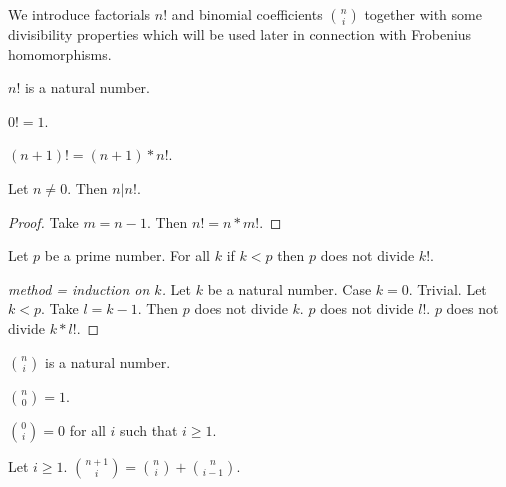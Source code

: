 \documentclass[11pt]{article}
\begin{document}
\newcommand{\cho}[2]{{#1 \choose #2}}

We introduce factorials $n!$ and binomial coefficients
$\cho{n}{i}$ together with some divisibility properties
which will be used later in connection with
Frobenius homomorphisms.

\newcommand{\fac}[1]{#1 !}

\begin{forthel}

\begin{signature}
$\fac{n}$ is a natural number.
\end{signature}

\begin{axiom}
$\fac{0} = 1$.
\end{axiom}

\begin{axiom}
$\fac{(n+1)} = (n+1) * \fac{n}$.
\end{axiom}

\begin{lemma} Let $n \neq 0$. Then $n | \fac{n}$.
\end{lemma}
\begin{proof}
Take $m = n - 1$.
Then $\fac{n} = n * \fac{m}$.
\end{proof}

\begin{lemma}
Let $p$ be a prime number.
For all $k$ if $k < p$ then $p$ does not divide $\fac{k}$.
\end{lemma}
\begin{proof}[method = induction on $k$]
Let $k$ be a natural number.
Case $k = 0$. Trivial.
Let $k < p$.
Take $l = k - 1$.
Then $p$ does not divide $k$. $p$ does not divide $\fac{l}$.
$p$ does not divide $k * \fac{l}$.
\end{proof}

\begin{signature}
$\cho{n}{i}$ is a natural number.
\end{signature}

\begin{axiom}
$\cho{n}{0} = 1$.
\end{axiom}

\begin{axiom}
$\cho{0}{i} = 0$ for all $i$ such that $i \geq 1$.
\end{axiom}

\begin{axiom} Let $i \geq 1$.
$\cho{n+1}{i} = \cho{n}{i} + \cho{n}{i-1}$.
\end{axiom}


\end{forthel}
\end{document}
